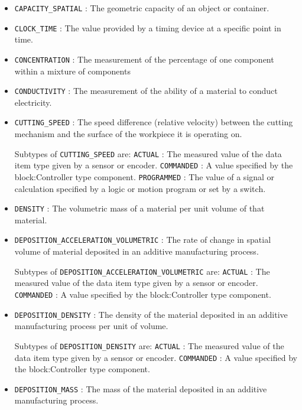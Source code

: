 \begin{itemize}
\item \texttt{CAPACITY_SPATIAL} : The geometric capacity of an object or container. 

\item \texttt{CLOCK_TIME} : The value provided by a timing device at a specific point in time. 

\item \texttt{CONCENTRATION} : The measurement of the percentage of one component within a mixture of components 

\item \texttt{CONDUCTIVITY} : The measurement of the ability of a material to conduct electricity. 

\item \texttt{CUTTING_SPEED} : The speed difference (relative velocity) between the cutting mechanism and the surface of the workpiece it is operating on. 

Subtypes of \texttt{CUTTING_SPEED} are: 
\newline\tab \texttt{ACTUAL} : The measured value of the data item type given by a sensor or encoder. 
\newline\tab \texttt{COMMANDED} : A value specified by the {block:Controller} type component. 
\newline\tab \texttt{PROGRAMMED} : The value of a signal or calculation specified by a logic or motion program or set by a switch. 
\item \texttt{DENSITY} : The volumetric mass of a material per unit volume of that material. 

\item \texttt{DEPOSITION_ACCELERATION_VOLUMETRIC} : The rate of change in spatial volume of material deposited in an additive manufacturing process. 

Subtypes of \texttt{DEPOSITION_ACCELERATION_VOLUMETRIC} are: 
\newline\tab \texttt{ACTUAL} : The measured value of the data item type given by a sensor or encoder. 
\newline\tab \texttt{COMMANDED} : A value specified by the {block:Controller} type component. 
\item \texttt{DEPOSITION_DENSITY} : The density of the material deposited in an additive manufacturing process per unit of volume. 

Subtypes of \texttt{DEPOSITION_DENSITY} are: 
\newline\tab \texttt{ACTUAL} : The measured value of the data item type given by a sensor or encoder. 
\newline\tab \texttt{COMMANDED} : A value specified by the {block:Controller} type component. 
\item \texttt{DEPOSITION_MASS} : The mass of the material deposited in an additive manufacturing process. 


\end{itemize}
